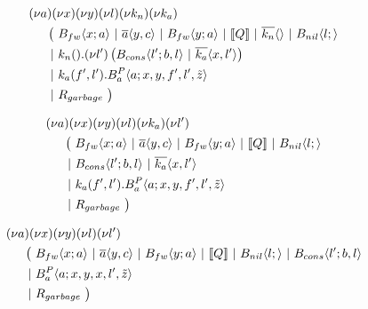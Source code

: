 \begin{align*}
  &\anew{a}{\anew{x}{\anew{y}{\anew{l}{\anew{k_n}{\anew{k_a}{ \\
    &\hspace{0.5cm}
    \begin{aligned}[t]
      \big(\ &\ains{B_{fw}}{x}{a}
      \apar   \asnd{a}{y,c}
      \apar   \ains{B_{fw}}{y}{a}
      \apar   \encMJtoAP{Q}
      \apar   \asnd{k_n}{}
      \apar   \ains{B_{nil}}{l}{}
      \\
      \apar  &\arcv{k_n}{} . \anew{l'}{\parens{\ains{B_{cons}}{l'}{b, l} \apar \asnd{k_a}{x, l'}}}
      \\
      \apar  &\arcv{k_a}{f',l'} . \ains{B_a^P}{a}{x, y, f', l',\tilde{z}}
      \\
      \apar  &R_{garbage}
      \ \big)
    \end{aligned}
  }}}}}}
\end{align*}


\begin{align*}
  &\anew{a}{\anew{x}{\anew{y}{\anew{l}{\anew{k_a}{\anew{l'}{ \\
    &\hspace{0.5cm}
    \begin{aligned}[t]
      \big(\ &\ains{B_{fw}}{x}{a}
      \apar   \asnd{a}{y,c}
      \apar   \ains{B_{fw}}{y}{a}
      \apar   \encMJtoAP{Q}
      \apar   \ains{B_{nil}}{l}{}
      \\
      \apar  &\ains{B_{cons}}{l'}{b, l}
      \apar   \asnd{k_a}{x, l'}
      \\
      \apar  &\arcv{k_a}{f',l'} . \ains{B_a^P}{a}{x, y, f', l',\tilde{z}}
      \\
      \apar  &R_{garbage}
      \ \big)
    \end{aligned}
  }}}}}}
\end{align*}


\begin{align*}
  &\anew{a}{\anew{x}{\anew{y}{\anew{l}{\anew{l'}{ \\
    &\hspace{0.5cm}
    \begin{aligned}[t]
      \big(\ &\ains{B_{fw}}{x}{a}
      \apar   \asnd{a}{y,c}
      \apar   \ains{B_{fw}}{y}{a}
      \apar   \encMJtoAP{Q}
      \apar   \ains{B_{nil}}{l}{}
      \apar   \ains{B_{cons}}{l'}{b, l}
      \\
      \apar  &\ains{B_a^P}{a}{x, y, x, l',\tilde{z}}
      \\
      \apar  &R_{garbage}
      \ \big)
    \end{aligned}
  }}}}}
\end{align*}

